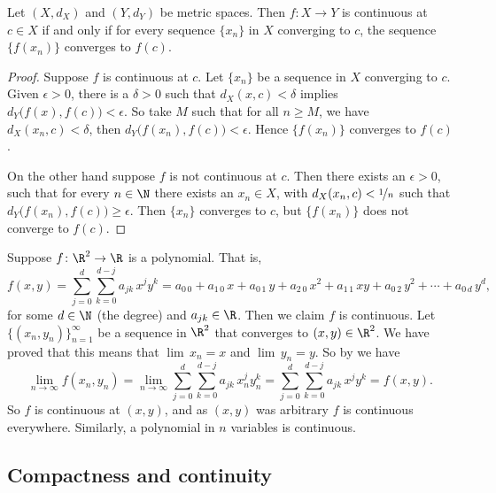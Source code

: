 \documentclass[12pt]{book}
\begin{document}
\begin{prop} \label{prop:contiscont}
Let $(X,d_X)$ and $(Y,d_Y)$ be metric spaces.
Then $f \colon X \to Y$ is
continuous at $c \in X$
if and only if for every sequence $\{ x_n \}$ in $X$
converging to $c$, the sequence $\{ f(x_n) \}$ converges
to $f(c)$.
\end{prop}

\begin{proof}
Suppose $f$ is continuous at $c$.
Let $\{ x_n \}$ be a
sequence in $X$ converging to $c$.
Given $\epsilon > 0$,
there is a $\delta > 0$ such that $d_X(x,c) < \delta$ implies
$d_Y\bigl(f(x),f(c)\bigr) < \epsilon$.
So take $M$ such that
for all $n \geq M$, we have $d_X(x_n,c) < \delta$, then
$d_Y\bigl(f(x_n),f(c)\bigr) < \epsilon$.
Hence $\{ f(x_n) \}$
converges to $f(c)$.

On the other hand suppose $f$ is not continuous at $c$.
Then there exists an $\epsilon > 0$,
such that for every $n \in \N$ there exists an $x_n \in X$,
with
$d_X(x_n,c) < \nicefrac{1}{n}$ such that $d_Y\bigl(f(x_n),f(c)\bigr) \geq
\epsilon$.
Then $\{ x_n \}$ converges to $c$, but $\{ f(x_n) \}$
does not converge to $f(c)$.
\end{proof}

\begin{example}
Suppose $f \colon \R^2 \to \R$ is a polynomial.
That is,
\begin{equation*}
f(x,y) =
\sum_{j=0}^d
\sum_{k=0}^{d-j}
a_{jk}\,x^jy^k =
a_{0\,0} + a_{1\,0} \, x +
a_{0\,1} \, y+  
a_{2\,0} \, x^2+  
a_{1\,1} \, xy+  
a_{0\,2} \, y^2+ \cdots +
a_{0\,d} \, y^d ,
\end{equation*}
for some $d \in \N$ (the degree) and $a_{jk} \in \R$.
Then we claim 
$f$ is continuous.
Let $\{ (x_n,y_n) \}_{n=1}^\infty$ be a sequence
in $\R^2$ that converges to $(x,y) \in \R^2$.
We have proved that this
means that $\lim\, x_n = x$ and $\lim\, y_n = y$.
So
by  we have
\begin{equation*}
\lim_{n\to\infty}
f(x_n,y_n) =
\lim_{n\to\infty}
\sum_{j=0}^d
\sum_{k=0}^{d-j}
a_{jk} \, x_n^jy_n^k 
=
\sum_{j=0}^d
\sum_{k=0}^{d-j}
a_{jk} \, x^jy^k
=
f(x,y) .
\end{equation*}
So $f$ is continuous at $(x,y)$, and as $(x,y)$ was arbitrary $f$ is
continuous everywhere.
Similarly, a
polynomial in $n$ variables is continuous.
\end{example}

\subsection*{Compactness and continuity}
\end{document}
